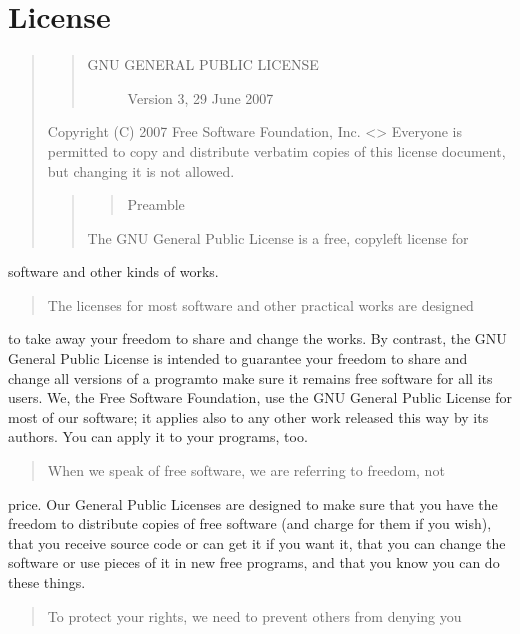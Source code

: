 \documentclass[letterpaper,10pt,english]{sphinxmanual}
\begin{document}
\chapter{License}
\label{\detokenize{license::doc}}\label{\detokenize{license:license}}\begin{quote}
\begin{quote}
\begin{description}
\item[{GNU GENERAL PUBLIC LICENSE}] \leavevmode
Version 3, 29 June 2007

\end{description}
\end{quote}

Copyright (C) 2007 Free Software Foundation, Inc. \textless{}\textgreater{}
Everyone is permitted to copy and distribute verbatim copies
of this license document, but changing it is not allowed.
\begin{quote}
\begin{quote}

Preamble
\end{quote}

The GNU General Public License is a free, copyleft license for
\end{quote}
\end{quote}

software and other kinds of works.
\begin{quote}

The licenses for most software and other practical works are designed
\end{quote}

to take away your freedom to share and change the works.  By contrast,
the GNU General Public License is intended to guarantee your freedom to
share and change all versions of a program\textendash{}to make sure it remains free
software for all its users.  We, the Free Software Foundation, use the
GNU General Public License for most of our software; it applies also to
any other work released this way by its authors.  You can apply it to
your programs, too.
\begin{quote}

When we speak of free software, we are referring to freedom, not
\end{quote}

price.  Our General Public Licenses are designed to make sure that you
have the freedom to distribute copies of free software (and charge for
them if you wish), that you receive source code or can get it if you
want it, that you can change the software or use pieces of it in new
free programs, and that you know you can do these things.
\begin{quote}

To protect your rights, we need to prevent others from denying you
\end{quote}
\end{document}
